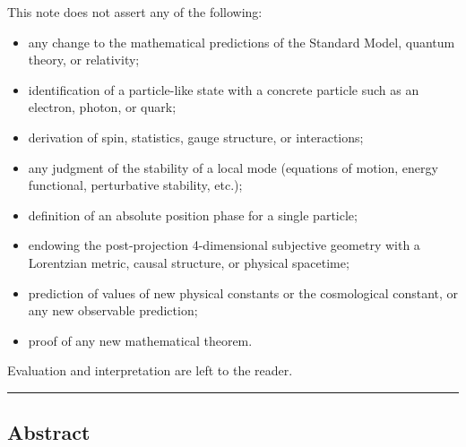 \documentclass[
]{article}
\providecommand{\tightlist}{%
  \setlength{\itemsep}{0pt}\setlength{\parskip}{0pt}}
\begin{document}
This note does not assert any of the following:

\begin{itemize}
\tightlist
\item
  any change to the mathematical predictions of the Standard Model,
  quantum theory, or relativity;
\item
  identification of a particle-like state with a concrete particle such
  as an electron, photon, or quark;
\item
  derivation of spin, statistics, gauge structure, or interactions;
\item
  any judgment of the stability of a local mode (equations of motion,
  energy functional, perturbative stability, etc.);
\item
  definition of an absolute position phase for a single particle;
\item
  endowing the post-projection 4-dimensional subjective geometry with a
  Lorentzian metric, causal structure, or physical spacetime;
\item
  prediction of values of new physical constants or the cosmological
  constant, or any new observable prediction;
\item
  proof of any new mathematical theorem.
\end{itemize}

Evaluation and interpretation are left to the reader.

\begin{center}\rule{0.5\linewidth}{0.5pt}\end{center}

\subsection{Abstract}\label{abstract}
\end{document}
